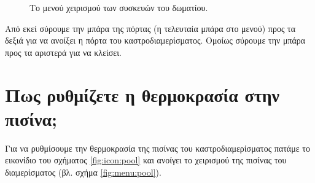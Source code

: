 \documentclass[a4paper,titlepage,twoside,12pt,leqno]{article}
\begin{document}
\begin{figure}
\begin{center}
\caption{Το μενού χειρισμού των συσκευών του δωματίου.}
\label{fig:menu:room}
\end{center}
\end{figure}

Από εκεί σύρουμε την μπάρα της πόρτας (η τελευταία μπάρα στο μενού) προς τα δεξιά για να ανοίξει η πόρτα του καστροδιαμερίσματος. Ομοίως σύρουμε την μπάρα προς τα αριστερά για να κλείσει.  

\newpage
\section{Πως ρυθμίζετε η θερμοκρασία στην πισίνα;}

Για να ρυθμίσουμε την θερμοκρασία της πισίνας του καστροδιαμερίσματος πατάμε το εικονίδιο του σχήματος \ref{fig:icon:pool} και ανοίγει το χειρισμού της πισίνας του διαμερίσματος (βλ. σχήμα \ref{fig:menu:pool}).
\end{document}
